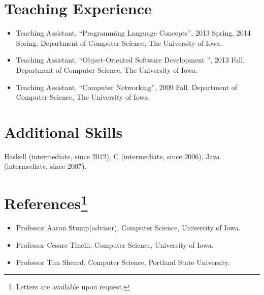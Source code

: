 \documentclass[11pt]{article}
\begin{document}
\section*{Teaching Experience}

\begin{itemize}
\item Teaching Assistant,  ``Programming Language Concepts'', 2013 Spring, 2014 Spring. Department of Computer Science, The University of Iowa.
\item Teaching Assistant,  ``Object-Oriented Software Development '', 2013 Fall. Department of Computer Science, The University of Iowa.
  \item Teaching Assistant, ``Computer Networking'', 2009 Fall. Department of Computer Science, The University of Iowa.
\end{itemize}

\section*{Additional Skills}
Haskell (intermediate, since 2012), C (intermediate, since 2006), Java (intermediate, since 2007). 
%
\section*{References\footnote{Letters are available upon request.}}
\begin{itemize}
\item Professor Aaron Stump(advisor), Computer Science, University of Iowa. 
\item Professor Cesare Tinelli, Computer Science, University of Iowa. 
\item Professor Tim Sheard, Computer Science, Portland State University. 
\end{itemize}



\end{document}
